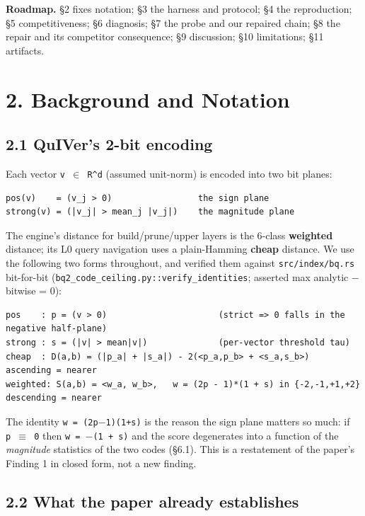 \documentclass[
  10pt,
]{article}
\begin{document}
\textbf{Roadmap.} §2 fixes notation; §3 the harness and protocol; §4 the
reproduction; §5 competitiveness; §6 diagnosis; §7 the probe and our
repaired chain; §8 the repair and its competitor consequence; §9
discussion; §10 limitations; §11 artifacts.

\section{2. Background and Notation}\label{background-and-notation}

\subsection{2.1 QuIVer's 2-bit encoding}\label{quivers-2-bit-encoding}

Each vector \texttt{v\ $\in$\ R\^{}d} (assumed unit-norm) is encoded into
two bit planes:

\begin{verbatim}
pos(v)    = (v_j > 0)                 the sign plane
strong(v) = (|v_j| > mean_j |v_j|)    the magnitude plane
\end{verbatim}

The engine's distance for build/prune/upper layers is the 6-class
\textbf{weighted} distance; its L0 query navigation uses a plain-Hamming
\textbf{cheap} distance. We use the following two forms throughout, and
verified them against \texttt{src/index/bq.rs} bit-for-bit
(\texttt{bq2\_code\_ceiling.py::verify\_identities}; asserted max
\textbar analytic $-$ bitwise\textbar{} = 0):

\begin{verbatim}
pos    : p = (v > 0)                      (strict => 0 falls in the negative half-plane)
strong : s = (|v| > mean|v|)              (per-vector threshold tau)
cheap  : D(a,b) = (|p_a| + |s_a|) - 2(<p_a,p_b> + <s_a,s_b>)       ascending = nearer
weighted: S(a,b) = <w_a, w_b>,   w = (2p - 1)*(1 + s) in {-2,-1,+1,+2}   descending = nearer
\end{verbatim}

The identity \texttt{w\ =\ (2p$-$1)(1+s)} is the reason the sign plane
matters so much: if \texttt{p\ $\equiv$\ 0} then \texttt{w\ =\ $-$(1\ +\ s)} and
the score degenerates into a function of the \emph{magnitude} statistics
of the two codes (§6.1). This is a restatement of the paper's Finding 1
in closed form, not a new finding.

\subsection{2.2 What the paper already
establishes}\label{what-the-paper-already-establishes}
\end{document}
